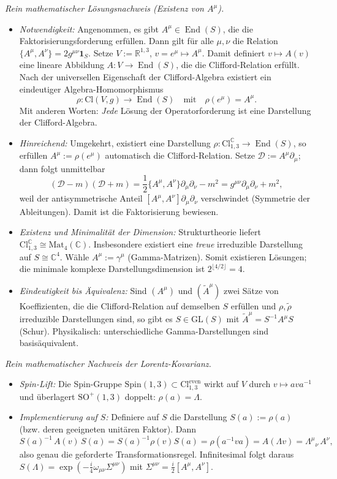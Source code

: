 \documentclass[10pt, letterpaper]{article}
\newcommand{\R}{\mathbb{R}}
\newcommand{\C}{\mathbb{C}}
\newcommand{\Cl}{\mathrm{Cl}}
\newcommand{\GL}{\mathrm{GL}}
\newcommand{\Mat}{\mathrm{Mat}}
\newcommand{\SO}{\mathrm{SO}}
\newcommand{\Spin}{\mathrm{Spin}}
\begin{document}
\emph{Rein mathematischer Lösungsnachweis (Existenz von $A^\mu$).}
\begin{itemize}\itemsep0.25ex
\item \emph{Notwendigkeit:} Angenommen, es gibt $A^\mu\in\operatorname{End}(S)$, die die Faktorisierungsforderung erfüllen. Dann gilt für alle $\mu,\nu$ die Relation $\{A^\mu,A^\nu\}=2g^{\mu\nu}\mathbf 1_S$. Setze $V:=\R^{1,3}$, $v=e^\mu\mapsto A^\mu$. Damit definiert $v\mapsto A(v)$ eine lineare Abbildung $A:V\to \operatorname{End}(S)$, die die Clifford-Relation erfüllt.
Nach der universellen Eigenschaft der Clifford-Algebra existiert ein eindeutiger Algebra-Homomorphismus
\[
\rho:\Cl(V,g)\to \operatorname{End}(S)\quad\text{mit}\quad \rho(e^\mu)=A^\mu.
\]
Mit anderen Worten: \emph{Jede} Lösung der Operatorforderung ist eine Darstellung der Clifford-Algebra.
\item \emph{Hinreichend:} Umgekehrt, existiert eine Darstellung $\rho:\Cl_{1,3}^{\C}\to \operatorname{End}(S)$, so erfüllen $A^\mu:=\rho(e^\mu)$ automatisch die Clifford-Relation. Setze $\mathcal D:=A^\mu\partial_\mu$; dann folgt unmittelbar
\[
(\mathcal D - m)(\mathcal D + m)
= \frac12\{A^\mu,A^\nu\}\partial_\mu\partial_\nu - m^2
= g^{\mu\nu}\partial_\mu\partial_\nu + m^2,
\]
weil der antisymmetrische Anteil $[A^\mu,A^\nu]\partial_\mu\partial_\nu$ verschwindet (Symmetrie der Ableitungen). Damit ist die Faktorisierung bewiesen.
\item \emph{Existenz und Minimalität der Dimension:} Strukturtheorie liefert $\Cl_{1,3}^{\C}\cong \Mat_4(\C)$. Insbesondere existiert eine \emph{treue} irreduzible Darstellung auf $S\cong \C^4$. Wähle $A^\mu:=\gamma^\mu$ (Gamma-Matrizen). Somit existieren Lösungen; die minimale komplexe Darstellungsdimension ist $2^{\lfloor 4/2\rfloor}=4$.
\item \emph{Eindeutigkeit bis Äquivalenz:} Sind $(A^\mu)$ und $(\tilde A^\mu)$ zwei Sätze von Koeffizienten, die die Clifford-Relation auf demselben $S$ erfüllen und $\rho,\tilde\rho$ irreduzible Darstellungen sind, so gibt es $S\in\GL(S)$ mit $\tilde A^\mu = S^{-1}A^\mu S$ (Schur). Physikalisch: unterschiedliche Gamma-Darstellungen sind basisäquivalent.
\end{itemize}

\emph{Rein mathematischer Nachweis der Lorentz-Kovarianz.}
\begin{itemize}\itemsep0.25ex
\item \emph{Spin-Lift:} Die Spin-Gruppe $\Spin(1,3)\subset \Cl_{1,3}^{\mathrm{even}}$ wirkt auf $V$ durch $v\mapsto a v a^{-1}$ und überlagert $\SO^+(1,3)$ doppelt: $\rho(a)=\Lambda$.
\item \emph{Implementierung auf $S$:} Definiere auf $S$ die Darstellung $S(a):=\rho(a)$ (bzw. deren geeigneten unitären Faktor). Dann
\[
S(a)^{-1}\,A(v)\,S(a)
= S(a)^{-1}\rho(v)S(a)
= \rho(a^{-1} v a)
= A(\Lambda v)
= \Lambda^\mu{}_\nu \, A^\nu,
\]
also genau die geforderte Transformationsregel. Infinitesimal folgt daraus $S(\Lambda)=\exp(-\frac{i}{4}\omega_{\mu\nu}\Sigma^{\mu\nu})$ mit $\Sigma^{\mu\nu}=\frac{i}{2}[A^\mu,A^\nu]$.
\end{itemize}
\end{document}
